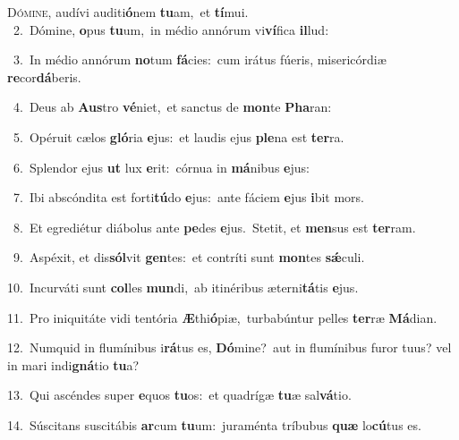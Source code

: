 \lettrine{\initial\textcolor{\initialcolor}{D}}{ómine,} audívi auditi\-\textbf{ó}\-nem \textbf{tu}\-am,~\star et \textbf{tí}\-mui.\\
{\numbfont\textcolor{\numbcolor}{~2.}}~Dómine, \textbf{o}\-pus \textbf{tu}\-um,~\star in médio annórum vi\-\textbf{ví}\-fica \textbf{il}\-lud:\par
{\numbfont\textcolor{\numbcolor}{~3.}}~In médio annórum \textbf{no}\-tum \textbf{fá}\-cies:~\star cum irátus fúeris, misericórdiæ \textbf{re}\-cor\-\textbf{dá}\-beris.\par
{\numbfont\textcolor{\numbcolor}{~4.}}~Deus ab \textbf{Aus}\-tro \textbf{vé}\-niet,~\star et sanctus de \textbf{mon}\-te \textbf{Pha}\-ran:\par
{\numbfont\textcolor{\numbcolor}{~5.}}~Opéruit cælos \textbf{gló}\-ria \textbf{e}\-jus:~\star et laudis ejus \textbf{ple}\-na est \textbf{ter}\-ra.\par
{\numbfont\textcolor{\numbcolor}{~6.}}~Splendor ejus \textbf{ut} lux \textbf{e}\-rit:~\star córnua in \textbf{má}\-nibus \textbf{e}\-jus:\par
{\numbfont\textcolor{\numbcolor}{~7.}}~Ibi abscóndita est forti\-\textbf{tú}\-do \textbf{e}\-jus:~\star ante fáciem \textbf{e}\-jus \textbf{i}\-bit mors.\par
{\numbfont\textcolor{\numbcolor}{~8.}}~Et egrediétur diábolus ante \textbf{pe}\-des \textbf{e}\-jus.~\star Stetit, et \textbf{men}\-sus est \textbf{ter}\-ram.\par
{\numbfont\textcolor{\numbcolor}{~9.}}~Aspéxit, et dis\-\textbf{sól}\-vit \textbf{gen}\-tes:~\star et contríti sunt \textbf{mon}\-tes \textbf{sǽ}\-culi.\par
{\numbfont\textcolor{\numbcolor}{10.}}~Incurváti sunt \textbf{col}\-les \textbf{mun}\-di,~\star ab itinéribus æterni\-\textbf{tá}\-tis \textbf{e}\-jus.\par
{\numbfont\textcolor{\numbcolor}{11.}}~Pro iniquitáte vidi tentória \textbf{Æ}\-thi\-\textbf{ó}\-piæ,~\star turbabúntur pelles \textbf{ter}\-ræ \textbf{Má}\-dian.\par
{\numbfont\textcolor{\numbcolor}{12.}}~Numquid in flumínibus i\-\textbf{rá}\-tus es, \textbf{Dó}\-mine?~\star aut in flumínibus furor tuus? vel in mari indi\-\textbf{gná}\-tio \textbf{tu}\-a?\par
{\numbfont\textcolor{\numbcolor}{13.}}~Qui ascéndes super \textbf{e}\-quos \textbf{tu}\-os:~\star et quadrígæ \textbf{tu}\-æ sal\-\textbf{vá}\-tio.\par
{\numbfont\textcolor{\numbcolor}{14.}}~Súscitans suscitábis \textbf{ar}\-cum \textbf{tu}\-um:~\star juraménta tríbubus \textbf{quæ} lo\-\textbf{cú}\-tus es.\par
